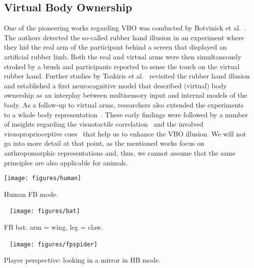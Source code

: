 \documentclass{sigchi-ext}
\begin{document}
\subsection{Virtual Body Ownership}


One of the pioneering works regarding VBO was conducted by Botvinick et al.~\cite{botvinick1998rubber}. The authors detected the so-called rubber hand illusion in an experiment where they hid the real arm of the participant behind a screen that displayed an artificial rubber limb. Both the real and virtual arms were then simultaneously stroked by a brush and participants reported to sense the touch on the virtual rubber hand. Further studies by Tsakiris et al.~\cite{tsakiris2005rubber,tsakiris2010my} revisited the rubber hand illusion and established a first neurocognitive model that described (virtual) body ownership as an interplay between multisensory input and internal models of the body. As a follow-up to virtual arms, researchers also extended the experiments to a whole body representation~\cite{ehrsson2007experimental,petkova2008if,lenggenhager2007video}. These early findings were followed by a number of insights regarding the visuotactile correlation~\cite{slater2008towards,sanchez2010virtual} and the involved visuoproprioceptive cues~\cite{slater2009inducing,perez2012my,maselli2013building,slater2010first} that help us to enhance the VBO illusion. We will not go into more detail at that point, as the mentioned works focus on anthropomorphic  representations and, thus, we cannot assume that the same principles are also applicable for animals.

\begin{marginfigure}[-14pc]
  \begin{minipage}{\marginparwidth}
    
        \centering
    \texttt{[image: figures/human]}
    \caption{Human FB mode.}~\label{fig:human}
    \vspace{0.5pc} 
            \centering
    \texttt{[image: figures/bat]}
    \caption{FB bat: arm = wing, leg = claw.}~\label{fig:bat}
        \vspace{1pc} 
    \centering
    \texttt{[image: figures/fpspider]}
    \caption{Player perspective: looking in a mirror in HB mode.}~\label{fig:fpspider}

  \end{minipage}
\end{marginfigure}
\end{document}

